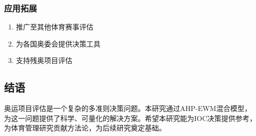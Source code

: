 \subsubsection{应用拓展}

\begin{enumerate}
\item 推广至其他体育赛事评估
\item 为各国奥委会提供决策工具
\item 支持残奥项目评估
\end{enumerate}

\subsection{结语}

奥运项目评估是一个复杂的多准则决策问题。本研究通过AHP-EWM混合模型，为这一问题提供了科学、可量化的解决方案。希望本研究能为IOC决策提供参考，为体育管理研究贡献方法论，为后续研究奠定基础。